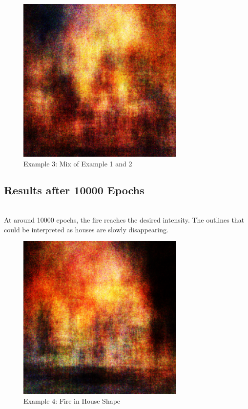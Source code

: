     \begin{figure}[htb!] 
    	\centering
    	\includegraphics[width=0.7\linewidth]{7500-3.pdf}
    	\caption{Example 3: Mix of Example 1 and 2}
    	\label{fig:7500-3}
    \end{figure}
    
    \pagebreak
   
    \subsection{Results after 10000 Epochs}\\
        At around 10000 epochs, the fire reaches the desired intensity. The outlines that could be interpreted as houses are slowly disappearing.
    
    \begin{figure}[htb!] 
    	\centering
    	\includegraphics[width=0.7\linewidth]{10000-1.pdf}
    	\caption{Example 4: Fire in House Shape}
    	\label{fig:10000-1}
    \end{figure}

